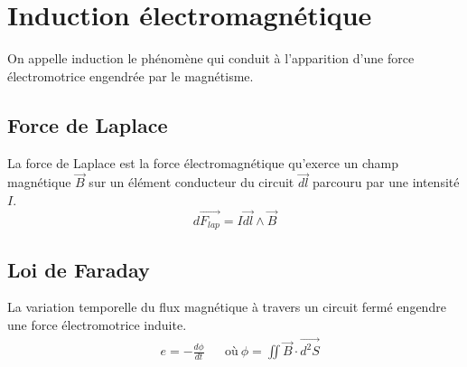 \chapter{Induction électromagnétique}

\begin{defi}
On appelle induction le phénomène qui conduit à l'apparition d'une force électromotrice engendrée par le magnétisme.
\end{defi}
\section{Force de Laplace}
\begin{defi}
La force de Laplace est la force électromagnétique qu'exerce un champ magnétique $\overrightarrow{B}$ sur un élément conducteur du circuit $\overrightarrow{dl}$ parcouru par une intensité $I$.
$$d\overrightarrow{F_{lap}}=I\overrightarrow{dl}\land\overrightarrow{B}$$
\end{defi}
\section{Loi de Faraday}
\begin{thm}
La variation temporelle du flux magnétique à travers un circuit fermé engendre une force électromotrice induite.
\begin{align*}
    & e=-\frac{d\phi}{dt} && \text{où}\ \phi=\iint\overrightarrow{B}\cdot\overrightarrow{d^2S}
\end{align*}
\end{thm}